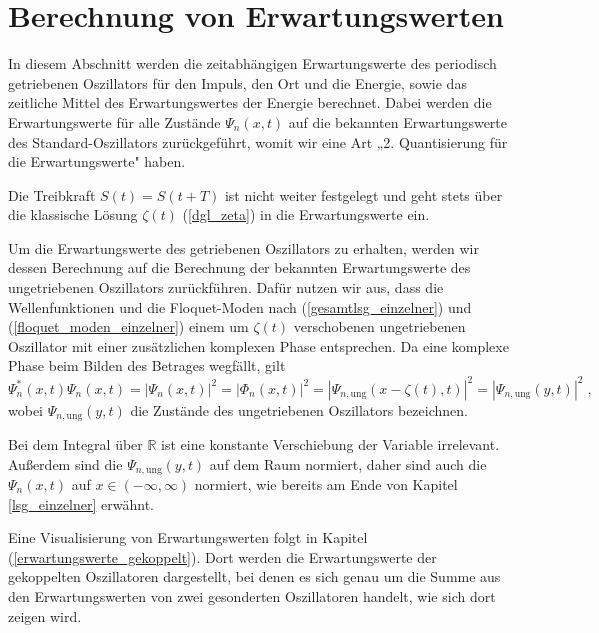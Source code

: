 

\chapter{Berechnung von Erwartungswerten}
\label{3}
  In diesem Abschnitt werden die zeitabhängigen Erwartungswerte des periodisch getriebenen Oszillators für den Impuls, den Ort und die Energie, sowie das zeitliche Mittel des Erwartungswertes der Energie berechnet.
  Dabei werden die Erwartungswerte für alle Zustände $\Psi_n(x,t)$ auf die bekannten Erwartungswerte des Standard-Oszillators zurückgeführt, womit wir eine Art „2. Quantisierung für die Erwartungswerte" haben.

  Die Treibkraft $S(t)=S(t+T)$ ist nicht weiter festgelegt und geht stets über die klassische Lösung $\zeta(t)$ (\ref{dgl_zeta}) in die Erwartungswerte ein.

  Um die Erwartungswerte des getriebenen Oszillators zu erhalten, werden wir dessen Berechnung auf die Berechnung der bekannten Erwartungswerte des ungetriebenen Oszillators zurückführen.
  Dafür nutzen wir aus, dass die Wellenfunktionen und die Floquet-Moden nach (\ref{gesamtlsg_einzelner}) und (\ref{floquet_moden_einzelner}) einem um $\zeta(t)$ verschobenen ungetriebenen Oszillator mit einer zusätzlichen komplexen Phase entsprechen.
  Da eine komplexe Phase beim Bilden des Betrages wegfällt, gilt
  \begin{equation}
    \Psi_n^*(x,t)\Psi_n(x,t) = |\Psi_n(x,t)|^2 = |\Phi_n(x,t)|^2 = |\Psi_{n,\text{ung}}(x-\zeta(t),t)|^2 = |\Psi_{n,\text{ung}}(y,t)|^2 \; ,
    \label{betrag_einzelner}
  \end{equation}
  wobei $\Psi_{n,\text{ung}}(y,t)$ die Zustände des ungetriebenen Oszillators bezeichnen.

  Bei dem Integral über $\mathbb{R}$ ist eine konstante Verschiebung der Variable irrelevant.
  Außerdem sind die $\Psi_{n,\text{ung}}(y,t)$ auf dem Raum normiert, daher sind auch die $\Psi_n(x,t)$ auf $x \in (-\infty,\infty)$ normiert, wie bereits am Ende von Kapitel \ref{lsg_einzelner} erwähnt.

  Eine Visualisierung von Erwartungswerten folgt in Kapitel (\ref{erwartungswerte_gekoppelt}).
  Dort werden die Erwartungswerte der gekoppelten Oszillatoren dargestellt, bei denen es sich genau um die Summe aus den Erwartungswerten von zwei gesonderten Oszillatoren handelt, wie sich dort zeigen wird.

